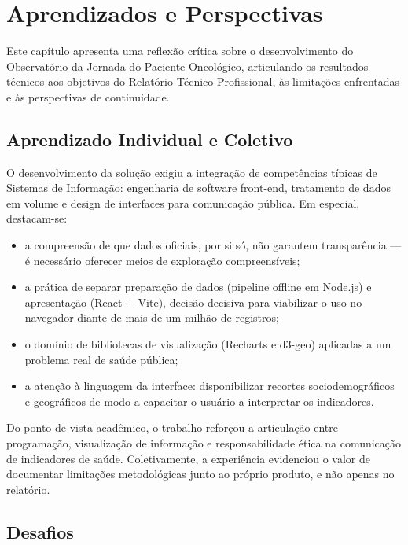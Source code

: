 \chapter[Aprendizados e Perspectivas]{Aprendizados e Perspectivas}
\label{cap:conclusao}

Este capítulo apresenta uma reflexão crítica sobre o desenvolvimento do Observatório da Jornada do Paciente Oncológico, articulando os resultados técnicos aos objetivos do Relatório Técnico Profissional, às limitações enfrentadas e às perspectivas de continuidade.

\section{Aprendizado Individual e Coletivo}

O desenvolvimento da solução exigiu a integração de competências típicas de Sistemas de Informação: engenharia de software front-end, tratamento de dados em volume e design de interfaces para comunicação pública. Em especial, destacam-se:

\begin{itemize}
	\item a compreensão de que dados oficiais, por si só, não garantem transparência --- é necessário oferecer meios de exploração compreensíveis;
	\item a prática de separar preparação de dados (pipeline offline em Node.js) e apresentação (React + Vite), decisão decisiva para viabilizar o uso no navegador diante de mais de um milhão de registros;
	\item o domínio de bibliotecas de visualização (Recharts e d3-geo) aplicadas a um problema real de saúde pública;
	\item a atenção à linguagem da interface: disponibilizar recortes sociodemográficos e geográficos de modo a capacitar o usuário a interpretar os indicadores.
\end{itemize}

Do ponto de vista acadêmico, o trabalho reforçou a articulação entre programação, visualização de informação e responsabilidade ética na comunicação de indicadores de saúde. Coletivamente, a experiência evidenciou o valor de documentar limitações metodológicas junto ao próprio produto, e não apenas no relatório.

\section{Desafios}

